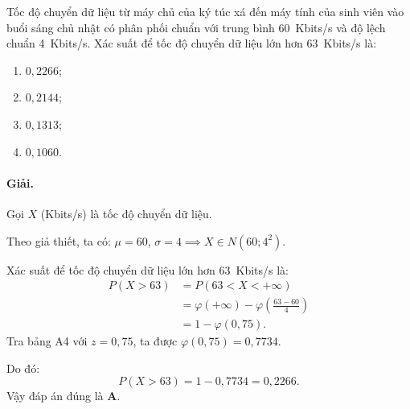 \begin{vidu}[VD 1]
Tốc độ chuyển dữ liệu từ máy chủ của ký túc xá đến máy tính của sinh viên vào buổi sáng chủ nhật có phân phối chuẩn với trung bình 60~Kbits/s và độ lệch chuẩn 4~Kbits/s. Xác suất để tốc độ chuyển dữ liệu lớn hơn 63~Kbits/s là:
\begin{enumerate}[label=\Alph*.]
    \item $0{,}2266$;
    \item $0{,}2144$;
    \item $0{,}1313$;
    \item $0{,}1060$.
\end{enumerate}

\paragraph{Giải.}
Gọi $X$ (Kbits/s) là tốc độ chuyển dữ liệu.

Theo giả thiết, ta có: $\mu = 60$, $\sigma = 4 \implies X \in N(60; 4^2)$.

Xác suất để tốc độ chuyển dữ liệu lớn hơn 63~Kbits/s là:
\begin{align*}
P(X > 63) &= P(63 < X < +\infty) \\
&= \varphi(+\infty) - \varphi\left(\frac{63 - 60}{4}\right) \\
&= 1 - \varphi(0{,}75).
\end{align*}
Tra bảng A4 với $z = 0{,}75$, ta được $\varphi(0{,}75) = 0{,}7734$.

Do đó:
\[
P(X > 63) = 1 - 0{,}7734 = 0{,}2266.
\]
Vậy đáp án đúng là \textbf{A}.
\end{vidu}

